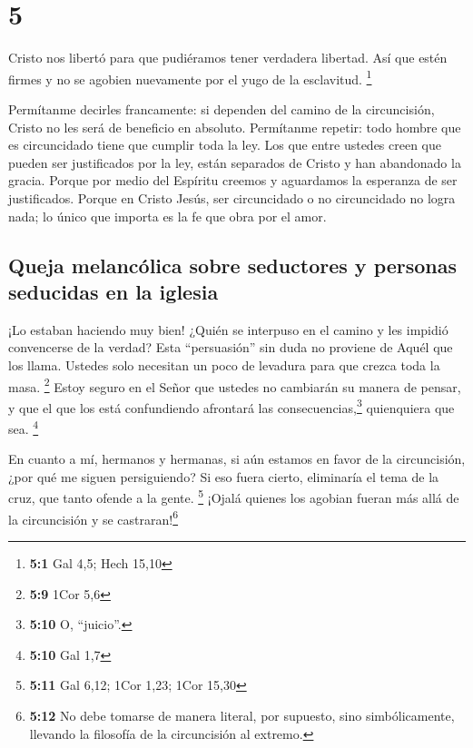 \hypertarget{section-4}{%
\section{5}\label{section-4}}

 Cristo nos libertó para que pudiéramos tener verdadera
libertad. Así que estén firmes y no se agobien nuevamente por el yugo de
la esclavitud. \footnote{\textbf{5:1} Gal 4,5; Hech 15,10}

 Permítanme decirles francamente: si dependen del camino
de la circuncisión, Cristo no les será de beneficio en absoluto.
 Permítanme repetir: todo hombre que es circuncidado tiene
que cumplir toda la ley.  Los que entre ustedes creen que
pueden ser justificados por la ley, están separados de Cristo y han
abandonado la gracia.  Porque por medio del Espíritu
creemos y aguardamos la esperanza de ser justificados. 
Porque en Cristo Jesús, ser circuncidado o no circuncidado no logra
nada; lo único que importa es la fe que obra por el amor.

\hypertarget{queja-melancuxf3lica-sobre-seductores-y-personas-seducidas-en-la-iglesia}{%
\subsection{Queja melancólica sobre seductores y personas seducidas en
la
iglesia}\label{queja-melancuxf3lica-sobre-seductores-y-personas-seducidas-en-la-iglesia}}

 ¡Lo estaban haciendo muy bien! ¿Quién se interpuso en el
camino y les impidió convencerse de la verdad?  Esta
``persuasión'' sin duda no proviene de Aquél que los llama.
 Ustedes solo necesitan un poco de levadura para que
crezca toda la masa. \footnote{\textbf{5:9} 1Cor 5,6} 
Estoy seguro en el Señor que ustedes no cambiarán su manera de pensar, y
que el que los está confundiendo afrontará las consecuencias,\footnote{\textbf{5:10}
  O, ``juicio''.} quienquiera que sea. \footnote{\textbf{5:10} Gal 1,7}

 En cuanto a mí, hermanos y hermanas, si aún estamos en
favor de la circuncisión, ¿por qué me siguen persiguiendo? Si eso fuera
cierto, eliminaría el tema de la cruz, que tanto ofende a la gente.
\footnote{\textbf{5:11} Gal 6,12; 1Cor 1,23; 1Cor 15,30} 
¡Ojalá quienes los agobian fueran más allá de la circuncisión y se
castraran!\footnote{\textbf{5:12} No debe tomarse de manera literal, por
  supuesto, sino simbólicamente, llevando la filosofía de la
  circuncisión al extremo.}

